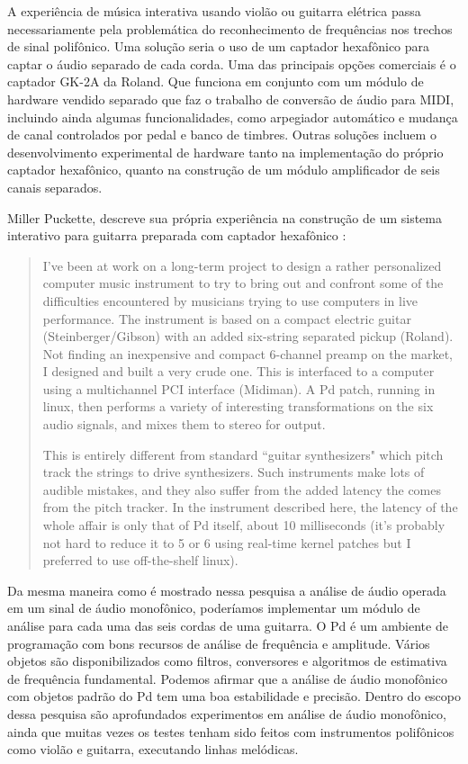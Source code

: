 \documentclass{ppgmus}
\begin{document}
A experiência de música interativa usando violão ou guitarra elétrica passa necessariamente
pela problemática do reconhecimento de frequências nos trechos de sinal polifônico.
Uma solução seria o uso de um captador hexafônico para captar o áudio separado de
cada corda. Uma das principais opções comerciais é o captador GK-2A da Roland.
Que funciona em conjunto com um módulo de hardware vendido separado que faz o trabalho de conversão 
de áudio para MIDI, incluindo ainda algumas funcionalidades, como arpegiador automático
e mudança de canal controlados por pedal  e banco de timbres.
Outras soluções incluem o desenvolvimento experimental de hardware tanto na implementação
do próprio captador hexafônico, quanto na construção de um módulo amplificador de seis
canais separados.

 
Miller Puckette, descreve sua própria experiência na construção de um sistema interativo
para guitarra preparada com captador hexafônico \cite{Puckette_patchfor}:

\begin{quotation}
I've been at work on a long-term project to design a rather personalized 
computer music instrument to try to bring out and confront some of the difficulties encountered by 
musicians trying to use computers in live performance. The instrument is based on a compact electric 
guitar (Steinberger/Gibson) with an added six-string separated pickup (Roland). Not finding an 
inexpensive and compact 6-channel preamp on the market, I designed and built a very crude one. 
This is interfaced to a computer using a multichannel PCI interface (Midiman). A Pd patch, running in 
linux, then performs a variety of interesting transformations on the six audio signals, and mixes them 
to stereo for output.

This is entirely different from standard ``guitar synthesizers" which pitch track the strings to drive 
synthesizers. Such instruments make lots of audible mistakes, and they also suffer from the added latency 
the comes from the pitch tracker. In the instrument described here, the latency of the whole affair is 
only that of Pd itself, about 10 milliseconds (it's probably not hard to reduce it to 5 or 6 using 
real-time kernel patches but I preferred to use off-the-shelf linux). 
\end{quotation}

Da mesma maneira como é mostrado nessa pesquisa a análise de áudio operada em um sinal de áudio
monofônico, poderíamos implementar um módulo de análise para cada uma das seis cordas de uma guitarra.
O Pd é um ambiente de programação com bons recursos de análise de frequência e amplitude. Vários
objetos são disponibilizados como filtros, conversores e algoritmos de estimativa de frequência fundamental.
Podemos afirmar que a análise de áudio monofônico com objetos padrão do Pd tem uma boa estabilidade e
precisão. Dentro do escopo dessa pesquisa são aprofundados experimentos em análise de áudio monofônico,
ainda que muitas vezes os testes tenham sido feitos com instrumentos polifônicos como violão e 
guitarra, executando linhas melódicas.
\end{document}
